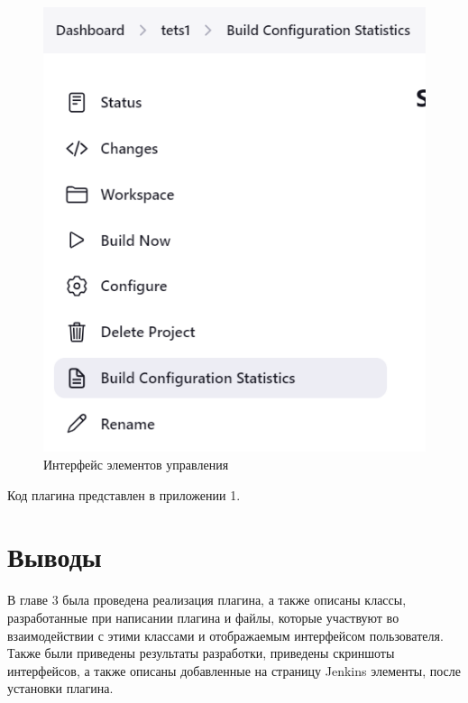 \begin{figure}[ht!] 
	\center
	\includegraphics [scale=0.47] {my_folder/images//ui3}
	\caption{Интерфейс элементов управления} 
	\label{fig:ui3}  
\end{figure}


Код плагина представлен в приложении 1.
 
\section{Выводы} \label{ch3:sec3}

В главе 3 была проведена реализация плагина, а также описаны классы, разработанные при написании плагина и файлы, которые участвуют во взаимодействии с этими классами и отображаемым интерфейсом пользователя. Также были приведены результаты разработки, приведены скриншоты интерфейсов, а также описаны добавленные на страницу Jenkins элементы, после установки плагина.





%
%


